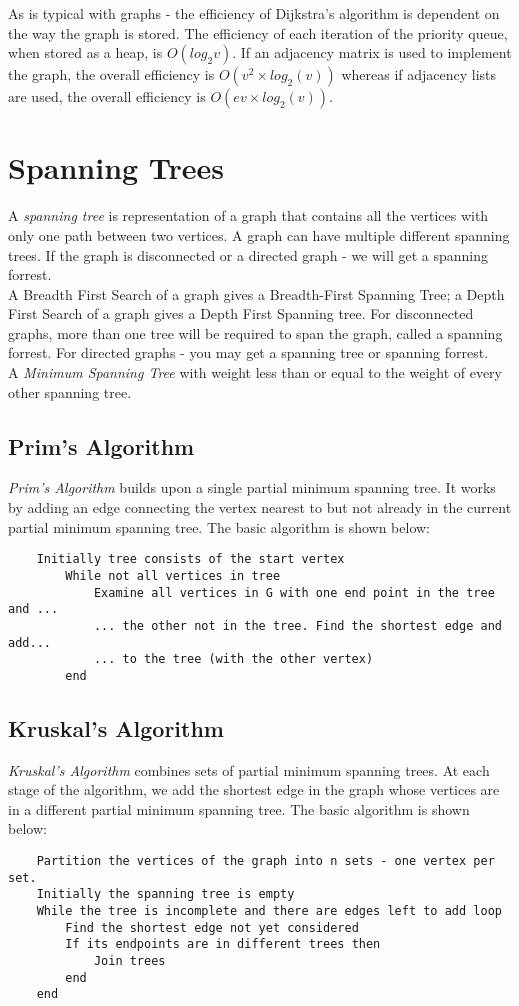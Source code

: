 As is typical with graphs - the efficiency of Dijkstra's algorithm is dependent on the way the graph is stored. The efficiency of each iteration of the priority queue, when stored as a heap, is $O(log_2 v)$. If an adjacency matrix  is used to implement the graph, the overall efficiency is $O(v^2 \times log_2 (v))$ whereas if adjacency lists are used, the overall efficiency is $O(ev \times log_2 (v))$. 

\section{Spanning Trees}
A \textit{spanning tree} is representation of a graph that contains all the vertices with only one path between two vertices. A graph can have multiple different spanning trees. If the graph is disconnected or a directed graph - we will get a spanning forrest.\\

A Breadth First Search of a graph gives a Breadth-First Spanning Tree; a Depth First Search of a graph gives a Depth First Spanning tree. For disconnected graphs, more than one tree will be required to span the graph, called a spanning forrest. For directed graphs - you may get a spanning tree or spanning forrest.\\

A \textit{Minimum Spanning Tree} with weight less than or equal to the weight of every other spanning tree. 

\subsection{Prim's Algorithm}
\textit{Prim's Algorithm} builds upon a single partial minimum spanning tree. It works by adding an edge connecting the vertex nearest to but not already in the current partial minimum spanning tree. The basic algorithm is shown below:
\begin{verbatim}
    Initially tree consists of the start vertex
        While not all vertices in tree
            Examine all vertices in G with one end point in the tree and ...
            ... the other not in the tree. Find the shortest edge and add... 
            ... to the tree (with the other vertex)
        end
\end{verbatim}

\subsection{Kruskal's Algorithm}
\textit{Kruskal's Algorithm} combines sets of partial minimum spanning trees. At each stage of the algorithm, we add the shortest edge in the graph whose vertices are in a different partial minimum spanning tree. The basic algorithm is shown below:
\begin{verbatim}
    Partition the vertices of the graph into n sets - one vertex per set.
    Initially the spanning tree is empty
    While the tree is incomplete and there are edges left to add loop
        Find the shortest edge not yet considered
        If its endpoints are in different trees then
            Join trees
        end
    end
\end{verbatim}

